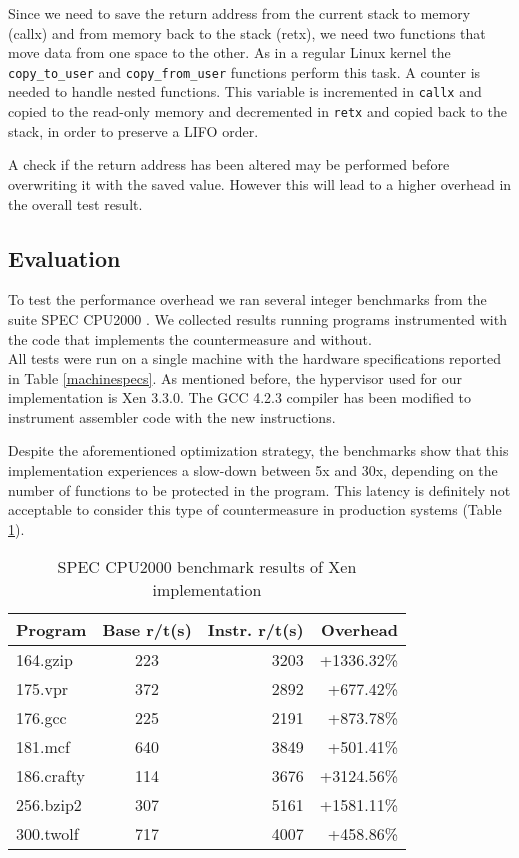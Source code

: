 Since we need to save the return address from the current stack to memory (callx) and from memory back to the stack (retx), we need two functions that move data from one space to the other. As in a regular Linux kernel the \texttt{copy\_to\_user} and \texttt{copy\_from\_user} functions perform this task. A counter is needed to handle nested functions. This variable is incremented in \texttt{callx} and copied to the read-only memory and decremented in \texttt{retx} and copied back to the stack, in order to preserve a LIFO order.

A check if the return address has been altered may be performed before overwriting it with the saved value. However this will lead to a higher overhead in the overall test result. 

\subsection{Evaluation}\label{ins:evaluation}
To test the performance overhead we ran several integer benchmarks from the suite SPEC CPU2000 \cite{spec2000}. We collected results running programs instrumented with the code that implements the countermeasure and without.\\
All tests were run on a single machine with the hardware specifications reported in Table \ref{machinespecs}. 
As mentioned before, the hypervisor used for our implementation is Xen 3.3.0. The GCC 4.2.3 compiler has been modified to instrument assembler code with the new instructions.

Despite the aforementioned optimization strategy, the benchmarks show that this implementation experiences a slow-down between 5x and 30x, depending on the number of functions to be protected in the program. This latency is definitely not acceptable to consider this type of countermeasure in production systems (Table \ref{table:xenres}).


\begin{table} \label{table:xenres}
 \begin{tabular}{ |l | c | r | r |}
    \hline
\textbf{Program} & \textbf{Base r/t(s)}& \textbf{Instr. r/t(s)}& \textbf{Overhead} \\ \hline
 164.gzip & 223 & 3203 & +1336.32\%  \\ \hline
 175.vpr  & 372 &  2892 &  +677.42\% \\ \hline
   176.gcc  & 225 & 2191 &    +873.78\%  \\ \hline
   181.mcf    &640   & 3849 &    +501.41\%  \\ \hline
   186.crafty    &114& 3676&   +3124.56\%  \\ \hline
   256.bzip2   &307 & 5161 &   +1581.11\%  \\ \hline
   300.twolf    &717 & 4007&   +458.86\%  \\
     \hline
  \end{tabular}
  \caption{SPEC CPU2000 benchmark results of Xen implementation}
\end{table}



